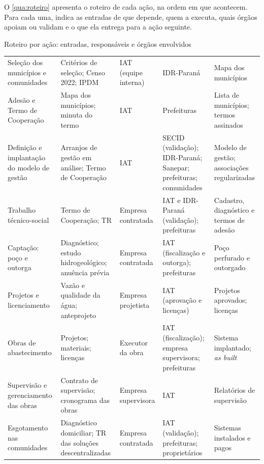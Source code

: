 O \autoref{qua:roteiro} apresenta o roteiro de cada ação, na ordem em que
acontecem. Para cada uma, indica as entradas de que depende, quem a executa,
quais órgãos apoiam ou validam e o que ela entrega para a ação seguinte.

\begin{quadro}[H]
\caption{Roteiro por ação: entradas, responsáveis e órgãos envolvidos}
\label{qua:roteiro}
\scriptsize
\renewcommand{\arraystretch}{1.25}
\setlength{\tabcolsep}{4pt}
\begin{tabularx}{\textwidth}{|P{2.7cm}|L|P{2.2cm}|L|L|}
\hline
{} &  &  &
 &  \\ \hline
Seleção dos municípios e comunidades & Critérios de seleção; Censo 2022; IPDM &
  IAT (equipe interna) & IDR-Paraná & Mapa dos municípios \\ \hline
Adesão e Termo de Cooperação & Mapa dos municípios; minuta do termo &
  IAT & Prefeituras & Lista de municípios; termos assinados \\ \hline
Definição e implantação do modelo de gestão & Arranjos de gestão em análise; Termo de Cooperação &
  IAT & SECID (validação); IDR-Paraná; Sanepar; prefeituras; comunidades &
  Modelo de gestão; associações regularizadas \\ \hline
Trabalho técnico-social & Termo de Cooperação; TR &
  Empresa contratada & IAT e IDR-Paraná (validação); prefeituras &
  Cadastro, diagnóstico e termos de adesão \\ \hline
Captação: poço e outorga & Diagnóstico; estudo hidrogeológico; anuência prévia &
  Empresa contratada & IAT (fiscalização e outorga); prefeituras & Poço perfurado e outorgado \\ \hline
Projetos e licenciamento & Vazão e qualidade da água; anteprojeto &
  Empresa projetista & IAT (aprovação e licenças) & Projetos aprovados; licenças \\ \hline
Obras de abastecimento & Projetos; materiais; licenças &
  Executor da obra & IAT (fiscalização); empresa supervisora; prefeituras &
  Sistema implantado; \textit{as built} \\ \hline
Supervisão e gerenciamento das obras & Contrato de supervisão; cronograma das obras &
  Empresa supervisora & IAT & Relatórios de supervisão \\ \hline
Esgotamento nas comunidades & Diagnóstico domiciliar; TR das soluções descentralizadas &
  Empresa contratada & IAT (validação); prefeituras; proprietários & Sistemas instalados e pagos \\ \hline

\end{tabularx}
\end{quadro}
